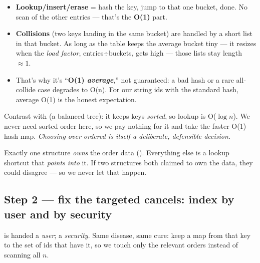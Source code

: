 \begin{itemize}[leftmargin=1.4em,nosep]
  \item \textbf{Lookup/insert/erase} = hash the key, jump to that one bucket, done.
        No scan of the other entries --- that's the \textbf{O(1)} part.
  \item \textbf{Collisions} (two keys landing in the same bucket) are handled by a
        short list in that bucket. As long as the table keeps the average bucket
        tiny --- it resizes when the \emph{load factor}, entries$\div$buckets, gets
        high --- those lists stay length $\approx1$.
  \item That's why it's ``\textbf{O(1) \emph{average}},'' not guaranteed: a bad hash
        or a rare all-collide case degrades to O(n). For our string ids with the
        standard hash, average O(1) is the honest expectation.
\end{itemize}

\begin{intu}
Contrast with  (a balanced tree): it keeps keys \emph{sorted}, so
lookup is O($\log n$). We never need sorted order here, so we pay nothing for it
and take the faster O(1) hash map. \emph{Choosing  over ordered
is itself a deliberate, defensible decision.}
\end{intu}

\begin{keybox}
Exactly one structure \emph{owns} the order data (). Everything
else is a lookup shortcut that \emph{points into} it. If two structures both
claimed to own the data, they could disagree --- so we never let that happen.
\end{keybox}

\subsection{Step 2 --- fix the targeted cancels: index by user and by security}

 is handed a \emph{user}; 
a \emph{security}. Same disease, same cure: keep a map from that key to the set of
ids that have it, so we touch only the relevant orders instead of scanning all $n$.

\begin{center}
\end{center}

